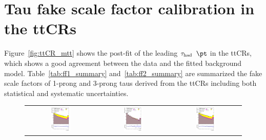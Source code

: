 \section{Tau fake scale factor calibration in the ttCRs}
\label{sec:tauFF_appendix}

Figure~\ref{fig:ttCR_mtt} shows the post-fit of the leading $\tau_\text{had}$ $\pt$ in the ttCRs, which shows a good agreement between the data and the fitted background model.
Table~\ref{tab:ff1_summary} and~\ref{tab:ff2_summary} are summarized the fake scale factors of 1-prong and 3-prong taus
derived from the ttCRs including both statistical and systematic uncertainties. 

\begin{figure}[H]
\centering
\begin{tabular}{@{}ccc@{}}
\includegraphics[page=1,width=0.29\textwidth]{figures/ttCR/tuH_reg1l1tau2b2j_os_log_ttCR.pdf} &
\includegraphics[page=1,width=0.29\textwidth]{figures/ttCR/tuH_reg1l1tau2b2j_ss_log_ttCR.pdf}&
\includegraphics[page=1,width=0.29\textwidth]{figures/ttCR/tuH_reg1l1tau2b3j_os_log_ttCR.pdf}\\

\end{tabular}
\end{figure}

